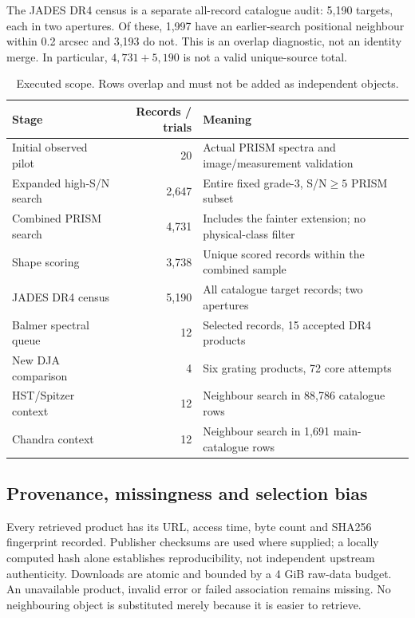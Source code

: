 \documentclass[11pt,a4paper]{article}
\begin{document}
The JADES DR4 census is a separate all-record catalogue audit: 5,190 targets, each in two apertures. Of these, 1,997 have an earlier-search positional neighbour within 0.2 arcsec and 3,193 do not. This is an overlap diagnostic, not an identity merge. In particular, $4,731+5,190$ is not a valid unique-source total.

\begin{table}[!htbp]\centering\small
\caption{Executed scope. Rows overlap and must not be added as independent objects.}
\begin{tabularx}{\linewidth}{@{}l r X@{}}\toprule
Stage & Records / trials & Meaning\\\midrule
Initial observed pilot & 20 & Actual PRISM spectra and image/measurement validation\\
Expanded high-S/N search & 2,647 & Entire fixed grade-3, S/N$\ge5$ PRISM subset\\
Combined PRISM search & 4,731 & Includes the fainter extension; no physical-class filter\\
Shape scoring & 3,738 & Unique scored records within the combined sample\\
JADES DR4 census & 5,190 & All catalogue target records; two apertures\\
Balmer spectral queue & 12 & Selected records, 15 accepted DR4 products\\
New DJA comparison & 4 & Six grating products, 72 core attempts\\
HST/Spitzer context & 12 & Neighbour search in 88,786 catalogue rows\\
Chandra context & 12 & Neighbour search in 1,691 main-catalogue rows\\\bottomrule
\end{tabularx}
\end{table}

\subsection{Provenance, missingness and selection bias}
Every retrieved product has its URL, access time, byte count and SHA256 fingerprint recorded. Publisher checksums are used where supplied; a locally computed hash alone establishes reproducibility, not independent upstream authenticity. Downloads are atomic and bounded by a 4 GiB raw-data budget. An unavailable product, invalid error or failed association remains missing. No neighbouring object is substituted merely because it is easier to retrieve.
\end{document}
